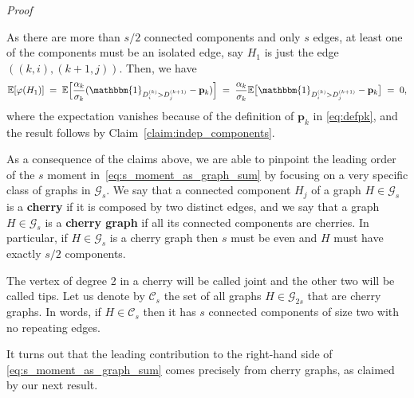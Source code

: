 \documentclass[reqno,a4paper,11pt]{amsart}
\makeatletter
\theoremstyle{remark}
\newcommand{\mc}[1]{{\mathcal #1}}
\newcommand{\mb}[1]{{\mathbf #1}}
\newcommand{\bb}[1]{{\mathbb #1}}
\newcommand{\ind}{\mathbbm{1}}
\numberwithin{equation}{section}
\renewenvironment{proof}[1][Proof]{\par
\pushQED{\qed}%
\normalfont \topsep6\p@\@plus6\p@\relax
\trivlist
\item\relax
{\itshape
#1\@addpunct{.}}\hspace\labelsep\ignorespaces
}{%
\popQED\endtrivlist\@endpefalse
}
\makeatother
\begin{document}
\begin{proof}
As there are more than $s/2$ connected components and only $s$ edges, at least
one of the components must be an isolated edge, say $H_1$ is just the edge
$((k,i),  (k+1,j))$. Then, we have
\begin{equation*}
\bb E [\varphi(H_1)]
    \;=\; \bb E\Bigl[
        \frac{\alpha_k}{\sigma_k}(\ind_{D^{(k)}_{i} > D^{(k+1)}_{j}} - \mb p_k)
        \Bigr]
    \;=\; \frac{\alpha_k}{\sigma_k} \bb E\bigl[
        \ind_{D^{(k)}_{i} > D^{(k+1)}_{j}} - \mb p_k
        \bigr]
    \;=\; 0,
\end{equation*}
where the expectation vanishes because of the definition of $\mb p_k$ in \eqref{eq:defpk}, and the result follows by Claim~\ref{claim:indep_components}.
\end{proof}


As a consequence of the claims above, we are able to pinpoint the leading order of the
$s$ moment in~\eqref{eq:s_moment_as_graph_sum} by focusing on a very specific
class of graphs in $\mc G_s$. We say that a connected component $H_j$ of a graph $H\in \mc G_s$ is a
\textbf{cherry} if it is composed by two distinct edges, and we say that a
graph $H\in \mc G_s$ is a \textbf{cherry graph} if all its connected components are
cherries. In particular, if $H\in \mc G_s$ is a cherry graph then $s$ must be even and $H$ must have exactly $s/2$ components.

The vertex of degree 2 in a cherry will be called joint and the other two will be called tips. Let us denote by $\mc C_s$ the set of all graphs $H \in \mc G_{2s}$ that are cherry graphs. In words, if $H \in \mc C_{s}$ then it has $s$ connected components of size two
with no repeating edges. 

It turns out that the leading contribution to the right-hand side of \eqref{eq:s_moment_as_graph_sum} comes precisely from cherry graphs, as claimed by our next result.
\end{document}
